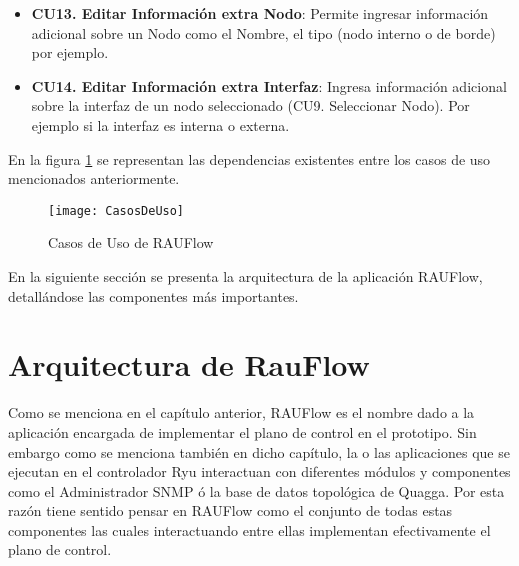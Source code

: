 \begin{itemize}
\item \textbf{CU13. Editar Informaci\'on extra Nodo}: Permite ingresar informaci\'on adicional sobre un Nodo como el Nombre, el tipo (nodo interno o de borde) por ejemplo.

\item \textbf{CU14. Editar Informaci\'on extra Interfaz}: Ingresa informaci\'on adicional sobre la interfaz de un nodo seleccionado (CU9. Seleccionar Nodo). Por ejemplo si la interfaz es interna o externa.
\end{itemize}

En la figura \ref{fig:CasosDeUso} se representan las dependencias existentes entre los casos de uso mencionados anteriormente.\\

\begin{figure}[ht!] 
\centering    
\texttt{[image: CasosDeUso]}
\caption[Casos de Uso de RAUFlow]{Casos de Uso de RAUFlow}
\label{fig:CasosDeUso}
\end{figure}

En la siguiente secci\'on se presenta la arquitectura de la aplicaci\'on RAUFlow, detallándose las componentes m\'as importantes.


\section[Arquitectura de RauFlow]{Arquitectura de RauFlow}


Como se menciona en el cap\'itulo anterior, RAUFlow es el nombre dado a la aplicaci\'on encargada de implementar el plano de control en el prototipo. Sin embargo como se menciona tambi\'en en dicho cap\'itulo, la o las aplicaciones que se ejecutan en el controlador Ryu interactuan con diferentes m\'odulos y componentes como el Administrador SNMP \'o la base de datos topol\'ogica de Quagga. Por esta raz\'on tiene sentido pensar en RAUFlow como el conjunto de todas estas componentes las cuales interactuando entre ellas implementan efectivamente el plano de control.\\

